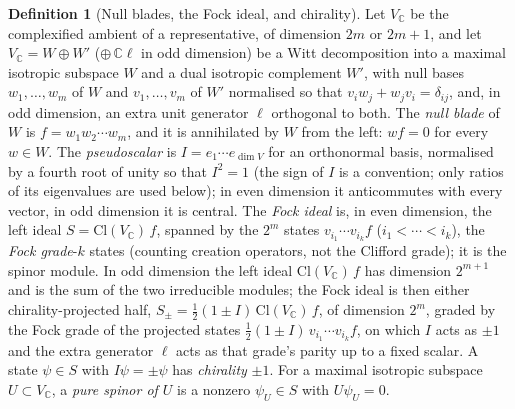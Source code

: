 \documentclass[11pt]{article}
\theoremstyle{definition}
\newtheorem{definition}[theorem]{Definition}
\theoremstyle{plain}
\providecommand{\C}{}\renewcommand{\C}{\mathbb{C}}
\providecommand{\Cl}{}\renewcommand{\Cl}{\mathrm{Cl}}
\begin{document}
\begin{definition}[Null blades, the Fock ideal, and chirality]\label{c:obj.dark-matter.null-blades-fock-ideal-chirality}
Let $V_{\C}$ be the complexified ambient of a representative, of dimension $2m$ or $2m + 1$, and let $V_{\C} = W \oplus W'$ ($\oplus\, \C\ell$ in odd dimension) be a Witt decomposition into a maximal isotropic subspace $W$ and a dual isotropic complement $W'$, with null bases $w_{1}, \ldots, w_{m}$ of $W$ and $v_{1}, \ldots, v_{m}$ of $W'$ normalised so that $v_{i}w_{j} + w_{j}v_{i} = \delta_{ij}$, and, in odd dimension, an extra unit generator $\ell$ orthogonal to both. The \emph{null blade} of $W$ is $f = w_{1}w_{2}\cdots w_{m}$, and it is annihilated by $W$ from the left: $wf = 0$ for every $w \in W$. The \emph{pseudoscalar} is $I = e_{1}\cdots e_{\dim V}$ for an orthonormal basis, normalised by a fourth root of unity so that $I^{2} = 1$ (the sign of $I$ is a convention; only ratios of its eigenvalues are used below); in even dimension it anticommutes with every vector, in odd dimension it is central. The \emph{Fock ideal} is, in even dimension, the left ideal $S = \Cl(V_{\C})\,f$, spanned by the $2^{m}$ states $v_{i_{1}}\cdots v_{i_{k}}f$ ($i_{1} < \cdots < i_{k}$), the \emph{Fock grade}-$k$ states (counting creation operators, not the Clifford grade); it is the spinor module. In odd dimension the left ideal $\Cl(V_{\C})\,f$ has dimension $2^{m+1}$ and is the sum of the two irreducible modules; the Fock ideal is then either chirality-projected half, $S_{\pm} = \tfrac{1}{2}(1 \pm I)\,\Cl(V_{\C})\,f$, of dimension $2^{m}$, graded by the Fock grade of the projected states $\tfrac{1}{2}(1 \pm I)\,v_{i_{1}}\cdots v_{i_{k}}f$, on which $I$ acts as $\pm 1$ and the extra generator $\ell$ acts as that grade's parity up to a fixed scalar. A state $\psi \in S$ with $I\psi = \pm\psi$ has \emph{chirality} $\pm 1$. For a maximal isotropic subspace $U \subset V_{\C}$, a \emph{pure spinor of $U$} is a nonzero $\psi_{U} \in S$ with $U\psi_{U} = 0$.
\end{definition}
\end{document}

